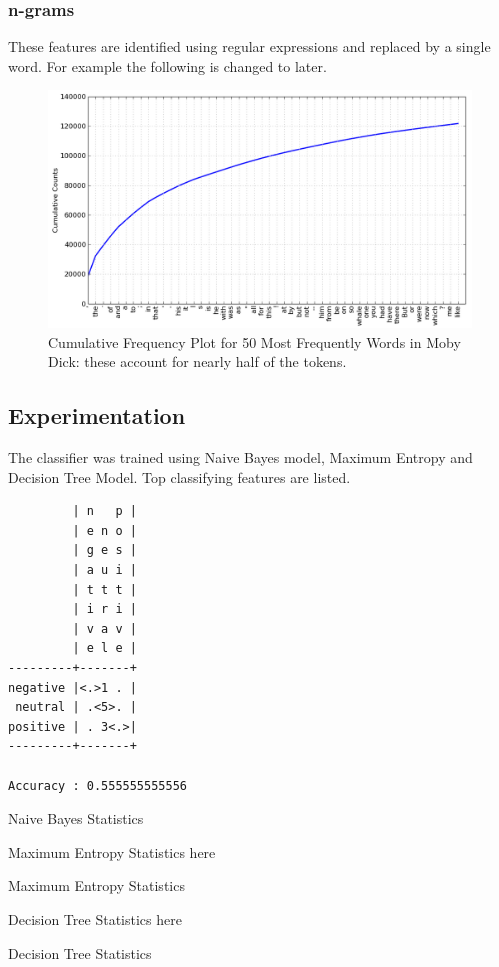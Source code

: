 \subsubsection{n-grams}
These features are identified using regular expressions and replaced by a single word.
For example the following is changed to later.

\begin{figure}[h]
\centering
\includegraphics[width=\textwidth]{img/fdist-moby.png}
\caption{Cumulative Frequency Plot for 50 Most Frequently Words in Moby Dick: these account for nearly half of the tokens.}
\label{fig:unigram}
\end{figure}

\subsection{Experimentation}
The classifier was trained using Naive Bayes model, Maximum Entropy and Decision Tree Model.
Top classifying features are listed.

\begin{table}[h]
\centering
\begin{verbatim}
         | n   p |
         | e n o |
         | g e s |
         | a u i |
         | t t t |
         | i r i |
         | v a v |
         | e l e |
---------+-------+
negative |<.>1 . |
 neutral | .<5>. |
positive | . 3<.>|
---------+-------+

Accuracy : 0.555555555556
\end{verbatim}
\caption{Naive Bayes Statistics}
\label{naive}
\end{table}

\begin{table}[h]
\centering
Maximum Entropy Statistics here
\caption{Maximum Entropy Statistics}
\label{maxent}
\end{table}

\begin{table}[h]
\centering
Decision Tree Statistics here
\caption{Decision Tree Statistics}
\label{dtree}
\end{table}


